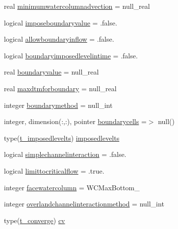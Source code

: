 \begin{DoxyCompactItemize}
\item 
real \mbox{\hyperlink{structmodulerunoff_1_1t__runoff_a5eeaacf415b966207e3aedf1f23ea4b8}{minimumwatercolumnadvection}} = null\+\_\+real
\item 
logical \mbox{\hyperlink{structmodulerunoff_1_1t__runoff_a05084bcb8a3b7f6033a85a6c31f308dc}{imposeboundaryvalue}} = .false.
\item 
logical \mbox{\hyperlink{structmodulerunoff_1_1t__runoff_a2cad64bcc7343ccc790476e339aa165c}{allowboundaryinflow}} = .false.
\item 
logical \mbox{\hyperlink{structmodulerunoff_1_1t__runoff_a2ed83fde349268a907136ca972be75a1}{boundaryimposedlevelintime}} = .false.
\item 
real \mbox{\hyperlink{structmodulerunoff_1_1t__runoff_aecdd7436cae7d9bee090e04d984567ea}{boundaryvalue}} = null\+\_\+real
\item 
real \mbox{\hyperlink{structmodulerunoff_1_1t__runoff_a21d8081df59ea07ceafae9975dcc149d}{maxdtmforboundary}} = null\+\_\+real
\item 
integer \mbox{\hyperlink{structmodulerunoff_1_1t__runoff_a59fec5047d2e402f44c967335a980315}{boundarymethod}} = null\+\_\+int
\item 
integer, dimension(\+:,\+:), pointer \mbox{\hyperlink{structmodulerunoff_1_1t__runoff_a9bd956d6e1c5589f5996b6485aea880a}{boundarycells}} =$>$ null()
\item 
type(\mbox{\hyperlink{structmodulerunoff_1_1t__imposedlevelts}{t\+\_\+imposedlevelts}}) \mbox{\hyperlink{structmodulerunoff_1_1t__runoff_a6d79f0fd54bbffb8e30757b5d404412f}{imposedlevelts}}
\item 
logical \mbox{\hyperlink{structmodulerunoff_1_1t__runoff_a344dd4ea50d7246da2c464f6ed6758a3}{simplechannelinteraction}} = .false.
\item 
logical \mbox{\hyperlink{structmodulerunoff_1_1t__runoff_afdbb4d731291f4fc29a76f42b964ff7b}{limittocriticalflow}} = .true.
\item 
integer \mbox{\hyperlink{structmodulerunoff_1_1t__runoff_a4ad210fd43aa06ed6221bed6f5cb0b04}{facewatercolumn}} = W\+C\+Max\+Bottom\+\_\+
\item 
integer \mbox{\hyperlink{structmodulerunoff_1_1t__runoff_a5877ff794bee1101f0a4b6550e73c051}{overlandchannelinteractionmethod}} = null\+\_\+int
\item 
type(\mbox{\hyperlink{structmodulerunoff_1_1t__converge}{t\+\_\+converge}}) \mbox{\hyperlink{structmodulerunoff_1_1t__runoff_aacf638aeb08720b334e6cddaa1fd3263}{cv}}
\item 

\end{DoxyCompactItemize}
